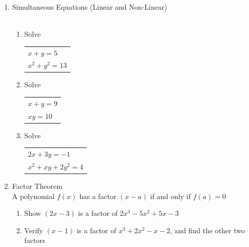 \documentclass[a4paper,14pt]{extarticle}
\begin{document}
\begin{enumerate}
\begin{enumerate}
\end{enumerate}

\item Simultaneous Equations (Linear and Non-Linear)\\[4pt]

\noindent{}\\[3pt]

\begin{enumerate}
\item{Solve
\begin{tabular}{ l } 
 $x + y = 5$\\
 $x^2 + y^2 = 13$\\
\end{tabular}}
\vspace{10cm}

\item{Solve
\begin{tabular}{ l } 
 $x + y = 9$\\
 $xy = 10$\\
\end{tabular}}
\newpage

\item{Solve
\begin{tabular}{ l } 
 $2x + 3y = -1$\\
 $x^2 + xy + 2y^2 = 4$\\
\end{tabular}}
\newpage

\end{enumerate}


\item Factor Theorem\\[4pt]
A polynomial $f(x)$ has a factor $(x-a)$ if and only if $f(a)=0$

\begin{enumerate}
\item{Show $(2x-3)$ is a factor of $2x^3 - 5x^2 + 5x - 3$}
\vspace{10cm}

\item{Verify $(x-1)$ is a factor of $x^3 + 2x^2 - x - 2$, and find the other two factors}
\newpage


\end{enumerate}
\end{enumerate}
\end{document}
